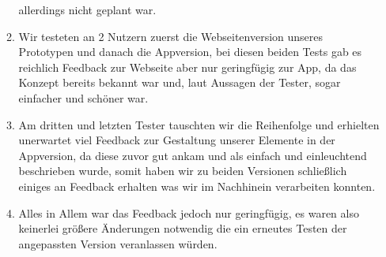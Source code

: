 \begin{enumerate}[label={\Roman*}]
\begin{enumerate}[label={\arabic*}]
allerdings nicht geplant war.
		\item Wir testeten an 2 Nutzern zuerst die Webseitenversion unseres Prototypen und danach die Appversion, bei
diesen beiden Tests gab es reichlich Feedback zur Webseite aber nur geringf\"ugig zur App, da das Konzept bereits bekannt war
und, laut Aussagen der Tester, sogar einfacher und sch\"oner war.
		\item Am dritten und letzten Tester tauschten wir die Reihenfolge und erhielten unerwartet viel Feedback zur
Gestaltung unserer Elemente in der Appversion, da diese zuvor gut ankam und als einfach und einleuchtend beschrieben wurde, somit
haben wir zu beiden Versionen schlie\ss{}lich einiges an Feedback erhalten was wir im Nachhinein verarbeiten konnten.
		\item Alles in Allem war das Feedback jedoch nur geringf\"ugig, es waren also keinerlei gr\"o\ss{}ere
\"Anderungen notwendig die ein erneutes Testen der angepassten Version veranlassen w\"urden.
	\end{enumerate}
\end{enumerate}
